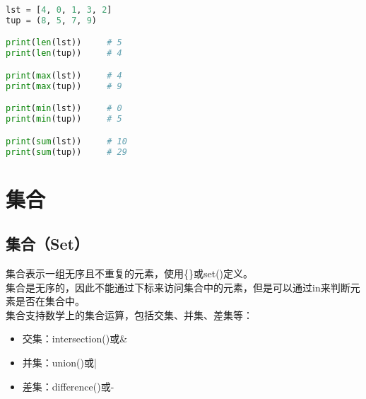 \begin{table}[H]
	\centering
	\caption{序列统计函数}
\end{table}

\begin{lstlisting}[language=Python]
lst = [4, 0, 1, 3, 2]
tup = (8, 5, 7, 9)

print(len(lst))		# 5
print(len(tup))		# 4

print(max(lst))		# 4
print(max(tup))		# 9

print(min(lst))		# 0
print(min(tup))		# 5

print(sum(lst))		# 10
print(sum(tup))		# 29
\end{lstlisting}

\newpage

\section{集合}

\subsection{集合（Set）}

集合表示一组无序且不重复的元素，使用\{\}或set()定义。\\

集合是无序的，因此不能通过下标来访问集合中的元素，但是可以通过in来判断元素是否在集合中。\\

集合支持数学上的集合运算，包括交集、并集、差集等：

\begin{itemize}
	\item 交集：intersection()或\&
	\item 并集：union()或|
	\item 差集：difference()或-
\end{itemize}

